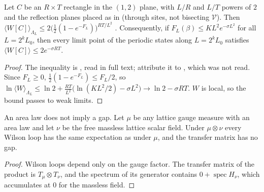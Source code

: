 \begin{proposition}\label{neg:prop-arealaw}
Let $C$ be an $R\times T$ rectangle in the $(1,2)$ plane, with $L/R$ and $L/T$ powers of $2$
and the reflection planes placed as in \cite{KT02} (through sites, not bisecting $\mathcal V$).
Then $\langle W[C]\rangle_{\Lambda_L}\le2\bigl(\tfrac12(1-e^{-F_L})\bigr)^{RT/L^2}$
\cite[(11)]{KT02}. Consequently, if $F_L(\beta)\le KL^2e^{-\sigma L^2}$ for all $L=2^kL_0$, then
every limit point of the periodic states along $L=2^kL_0$ satisfies
$\langle W[C]\rangle\le2e^{-\sigma RT}$.
\end{proposition}

\begin{proof}
The inequality is \cite[(11)]{KT02}, read in full text; \cite{KT02} attribute it
to \cite{TY85}, which was not read. Since $F_L\ge0$, $\frac12(1-e^{-F_L})\le F_L/2$, so
$\ln\langle W\rangle_{\Lambda_L}\le\ln2+\frac{RT}{L^2}\bigl(\ln(KL^2/2)-\sigma L^2\bigr)\to\ln2-\sigma RT$.
$W$ is local, so the bound passes to weak limits.
\end{proof}

\begin{proposition}\label{neg:prop-noarea}
An area law does not imply a gap. Let $\mu$ be any lattice gauge measure with an area law and
let $\nu$ be the free massless lattice scalar field. Under $\mu\otimes\nu$ every Wilson loop has
the same expectation as under $\mu$, and the transfer matrix has no gap.
\end{proposition}

\begin{proof}
Wilson loops depend only on the gauge factor. The transfer matrix of the product is
$T_\mu\otimes T_\nu$, and the spectrum of its generator contains $0+\operatorname{spec}H_\nu$,
which accumulates at $0$ for the massless field.
\end{proof}

